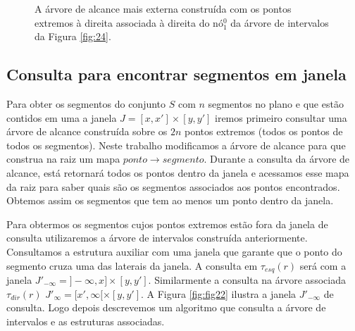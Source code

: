 \begin{figure}[h!]
    \centering
    \caption{A árvore de alcance mais externa construída com os pontos extremos à direita associada à direita do nó$^0_1$ da árvore de intervalos da Figura \ref{fig:24}.}
    \label{fig:range_tree_right_assoc_interval}
\end{figure}



\subsection{Consulta para encontrar segmentos em janela}
Para obter os segmentos do conjunto $S$ com $n$ segmentos no plano e que estão contidos em uma a janela $J=[x,x']\times[y, y']$ iremos primeiro consultar uma árvore de alcance construída sobre os $2n$ pontos extremos (todos os pontos de todos os segmentos). Neste trabalho modificamos a árvore de alcance para que construa na raiz um mapa $ponto \rightarrow segmento$. Durante a consulta da árvore de alcance, está retornará todos os pontos dentro da janela e acessamos esse mapa da raiz para saber quais são os segmentos associados aos pontos encontrados. Obtemos assim os segmentos que tem ao menos um ponto dentro da janela.

Para obtermos os segmentos cujos pontos extremos estão fora da janela de consulta utilizaremos a árvore de intervalos construída anteriormente. Consultamos a estrutura auxiliar com uma janela que garante que o ponto do segmento cruza uma das laterais da janela. A consulta em $\tau_{esq}(r)$ será com a janela $J'_{-\infty}=]-\infty, x] \times [y, y']$. Similarmente a consulta na árvore associada $\tau_{dir}(r)$  $J'_{\infty}=[x', \infty[ \times [y, y']$. A Figura \ref{fig:fig22} ilustra a janela $J'_{-\infty}$ de consulta. Logo depois descrevemos um algoritmo que consulta a árvore de intervalos e as estruturas associadas.

